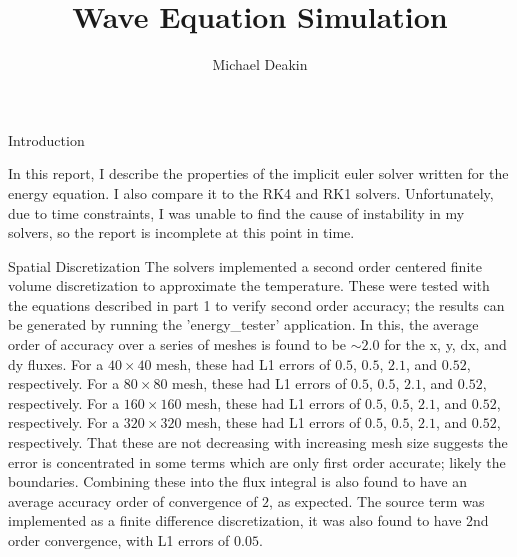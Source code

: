 \documentclass{article}
\title{Wave Equation Simulation}
\author{Michael Deakin}
\begin{document}
\maketitle

\begin{section}{Introduction}

In this report, I describe the properties of the implicit euler solver written for the energy equation.
I also compare it to the RK4 and RK1 solvers.
Unfortunately, due to time constraints, I was unable to find the cause of instability in my solvers, so the report is incomplete at this point in time.
\end{section}

\begin{section}{Spatial Discretization}
The solvers implemented a second order centered finite volume discretization to approximate the temperature.
These were tested with the equations described in part 1 to verify second order accuracy;
the results can be generated by running the 'energy\_tester' application. In this, the average order of accuracy over a series of meshes is found to be $\sim 2.0$ for the x, y, dx, and dy fluxes.
For a $40 \times 40$ mesh, these had L1 errors of $0.5$, $0.5$, $2.1$, and $0.52$, respectively.
For a $80 \times 80$ mesh, these had L1 errors of $0.5$, $0.5$, $2.1$, and $0.52$, respectively.
For a $160 \times 160$ mesh, these had L1 errors of $0.5$, $0.5$, $2.1$, and $0.52$, respectively.
For a $320 \times 320$ mesh, these had L1 errors of $0.5$, $0.5$, $2.1$, and $0.52$, respectively.
That these are not decreasing with increasing mesh size suggests the error is concentrated in some terms which are only first order accurate; likely the boundaries.
Combining these into the flux integral is also found to have an average accuracy order of convergence of $2$, as expected.
The source term was implemented as a finite difference discretization,
it was also found to have 2nd order convergence, with L1 errors of $0.05$.
\end{section}
\end{document}

